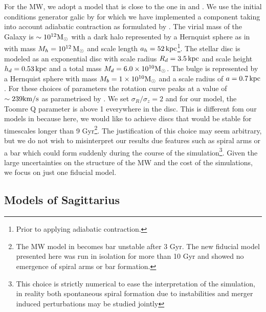 \documentclass[useAMS,usenatbib]{mnras}
\begin{document}
For the MW, we adopt a model that is close to the one in \cite{gomez15} and \cite{mcmillan11}. We use the initial conditions generator {\sc galic} by \cite{yurin14} for which we have implemented a component taking into account adiabatic contraction as formulated by \cite{blumenthal86}. The virial mass of the Galaxy is $\sim10^{12} \rm{M_{\odot}}$ with a dark halo represented by a Hernquist sphere as in \citep{Springel2005c} with mass $M_{h}=10^{12}\,\rm{M_{\odot}}$ and scale length $a_{h}=52\, \rm{kpc}$\footnote{Prior to applying adiabatic contraction.}. The stellar disc is modeled as an exponential disc with scale radius $R_{d}=3.5 \,\rm{kpc}$ and scale height $h_{d}=0.53 \,\rm{kpc}$ and a total mass $M_{d}=6.0\times 10^{10} \rm{M_{\odot}}$. The bulge is represented by a Hernquist sphere with mass $M_{b}=1\times10^{10} \rm{M_{\odot}}$ and a scale radius of $a=0.7 \,\rm{kpc}$. For these choices of parameters the rotation curve peaks at a value of $\sim 239 \rm{km/s}$ as parametrised by \cite{mcmillan11}. We set $\sigma_{R}/\sigma_{z}=2$ and for our model, the Toomre Q parameter is above 1 everywhere in the disc. This is different fom our models in \cite{laporte16} because here, we would like to achieve discs that would be stable for timescales longer than 9 Gyr\footnote{The MW model in \cite{laporte16} becomes bar unstable after 3 Gyr. The new fiducial model presented here was run in isolation for more than 10 Gyr and showed no emergence of spiral arms or bar formation.}. The justification of this choice may seem arbitrary, but we do not wish to misinterpret our results due features such as spiral arms or a bar which could form suddenly during the course of the simulation\footnote{This choice is strictly numerical to ease the interpretation of the simulation, in reality both spontaneous spiral formation due to instabilities and merger induced perturbations may be studied jointly}. Given the large uncertainties on the structure of the MW and the cost of the simulations, we focus on just one fiducial model.

\subsection{Models of Sagittarius}
\end{document}
